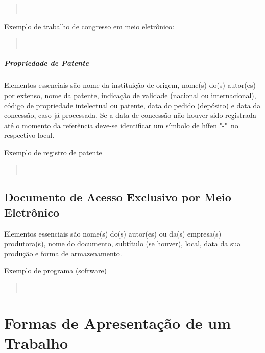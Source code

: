 \documentclass[repeatfields,xlists,xpacks,oneside,yearsonly]{ufrgscca}
\begin{document}
\begin{appendix}
\begin{quote}\noindent{}\\\end{quote}


Exemplo de trabalho de congresso em meio eletrônico:\\

\begin{quote}\noindent{}\\\end{quote}


\paragraph{Propriedade de Patente}

Elementos essenciais são nome da instituição de origem, nome(s) do(s)
autor(es) por extenso, nome da patente, indicação de validade (nacional ou
internacional), código de propriedade intelectual ou patente, data do pedido
(depósito) e data da concessão, caso já processada. Se a data de concessão
não houver sido registrada até o momento da referência deve-se identificar
um símbolo de hífen "-"\ no respectivo local.

Exemplo de registro de patente \\

\begin{quote}\noindent{}\\\end{quote}


\section{Documento de Acesso Exclusivo por Meio Eletrônico}

Elementos essenciais são nome(s) do(s) autor(es) ou da(s) empresa(s)
produtora(s), nome do documento, subtítulo (se houver), local, data da sua
produção e forma de armazenamento.

Exemplo de programa (software)\\

\begin{quote}\noindent{}\\\end{quote}



\chapter{Formas de Apresentação de um Trabalho}
\label{formas}


\end{appendix}
\end{document}
